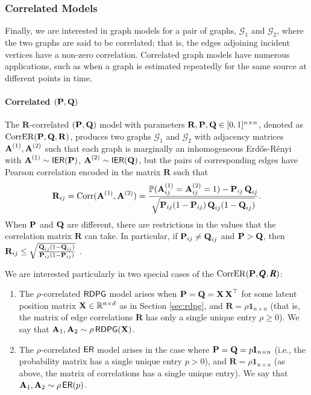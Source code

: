 \subsubsection{Correlated Models} \label{sec:correlated-graphs}
Finally, we are interested in graph models for a pair of graphs, $\mathcal{G}_1$ and $\mathcal{G}_2$, where the two graphs are said to be correlated; that is, the edges adjoining incident vertices have a non-zero correlation. Correlated graph models have numerous applications, such as when a graph is estimated repeatedly for the same source at different points in time.

\paragraph{Correlated $(\Pbf,\Q)$}

The $\mathbf{R}$-correlated $(\Pbf, \Q)$ model \cite{lyzinski2017matchability} with parameters $\mathbf{R}, \Pbf, \Q\in[0,1]^{n\times n}$, denoted as $\mathrm{CorrER}(\Pbf, \Q, \mathbf{R})$, produces two graphs $\mathcal{G}_1$ and $\mathcal{G}_2$ with adjacency matrices $\A^{(1)}, \A^{(2)}$ such that each graph is marginally an inhomogeneous Erd\H{o}s-R\'enyi with $\A^{(1)} \sim \ier(\Pbf)$, $\A^{(2)}\sim \ier(\Q)$, but the  pairs of corresponding edges have Pearson correlation  encoded in the matrix $\mathbf{R}$ such that 
$$\mathbf{R}_{ij} = \text{Corr}(\A^{(1)}, \A^{(2)})= \frac{\mathbb{P}(\A^{(1)}_{ij}=\A^{(2)}_{ij}=1)-\Pbf_{ij}\Q_{ij}}{\sqrt{\Pbf_{ij}(1-\Pbf_{ij}) \Q_{ij}(1-\Q_{ij})}}.$$
When $\Pbf$ and $\Q$ are different, there are restrictions in the values that the correlation matrix $\mathbf{R}$ can take. In particular, if $\Pbf_{ij}\neq\Q_{ij}$  and $\Pbf>\Q$, then $\mathbf{R}_{ij}\leq \sqrt{\frac{\Q_{ij}(1-\Q_{ij})}{\Pbf_{ij}(1-\Pbf_{ij})}}$ \cite{lyzinski2017matchability}.

We are interested particularly in two special cases of the $\mathrm{CorrER}(\Pbf, \pmb Q, \pmb R)$:
\begin{enumerate}
    \item The $\rho$-correlated $\rdpg$ model arises when $\Pbf = \Q=\X\X^\top$ for some latent position matrix $\X \in \RR^{n \times d}$  as in Section \ref{sec:rdpg}, and $\pmb R = \rho \pmb 1_{n \times n}$ (that is, the matrix of edge correlations $\pmb R$ has only a single unique entry $\rho\geq 0$). We say that $\A_1, \A_2 \sim \rho\rdpg(\X)$.
    \item The $\rho$-correlated $\er$ model arises in the case where $\Pbf = \Q = p\pmb 1_{n \times n}$ (i.e.,  the probability matrix has a single unique entry $p>0$), and $\pmb R = \rho\pmb 1_{n \times n}$ (as above, the matrix of correlations has a single unique entry). We say that $\A_1, \A_2 \sim \rho\er(p)$.
\end{enumerate}